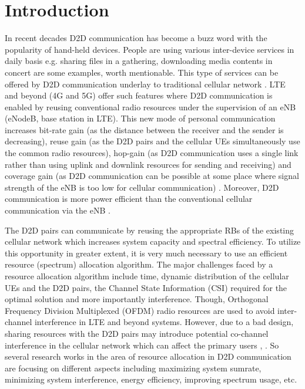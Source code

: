 \documentclass[times]{dacauth}
\begin{document}
\maketitle



\vspace{-6pt}

\section{Introduction}\label{section:Introduction}
\vspace {-0.3cm}
\noindent
In recent decades D2D communication has become a buzz word with the popularity of hand-held devices. People are using various inter-device services in daily basis e.g. sharing files in a gathering, downloading media contents in concert are some examples, worth mentionable. This type of services can be offered by D2D communication underlay to traditional cellular network \cite{doppler2009device}. LTE and beyond (4G and 5G) offer such features where D2D communication is enabled by reusing conventional radio resources under the supervision of an eNB (eNodeB, base station in LTE). This new mode of personal communication increases bit-rate gain (as the distance between the receiver and the sender is decreasing), reuse gain (as the D2D pairs and the cellular UEs simultaneously use the common radio resources), hop-gain (as D2D communication uses a single link rather than using uplink and downlink resources for sending and receiving) and coverage gain (as D2D communication can be possible at some place where signal strength of the eNB is too low for cellular communication) \cite{fodor}. Moreover, D2D communication is more power efficient than the conventional cellular communication via the eNB \cite{stefania}.
 
\smallskip
\noindent 
The D2D pairs can communicate by reusing the appropriate RBs of the existing cellular network which increases system capacity and spectral efficiency. To utilize this opportunity in greater extent, it is very much necessary to use an efficient resource (spectrum) allocation algorithm. The major challenges faced by a resource allocation algorithm include time, dynamic distribution of the cellular UEs and the D2D pairs, the Channel State Information (CSI) required for the optimal solution and more importantly interference. Though, Orthogonal Frequency Division Multiplexed (OFDM) radio resources are used to avoid inter-channel interference in LTE and beyond systems. However, due to a bad design, sharing resources with the D2D pairs may introduce potential co-channel interference in the cellular network which can affect the primary users  \cite{asadi2014survey}, \cite{min}. So several research works in the area of resource allocation in D2D communication are focusing on different aspects including maximizing system sumrate, minimizing system interference, energy efficiency, improving spectrum usage, etc.
\end{document}
